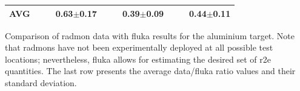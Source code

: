 \documentclass[encoding=utf8,british]{tumphthesis}
\begin{document}
\begin{table}[H]
\begin{subtable}{1\textwidth}
{\begin{tabular}{|l|llr|llr|llr|}
\textbf{AVG}                             &                                                      &                                                       & \textbf{0.63$\pm$0.17}                           &                                                      &                                                       & \textbf{0.39$\pm$0.09}                           &                                                      &                                                       & \textbf{0.44$\pm$0.11}                          \\ \hline
\end{tabular}}
\end{subtable}

\end{table}

\begin{table}[H]
\caption{Comparison of \acrshort{radmon} data with \acrshort{fluka} results for the aluminium target. Note that \acrshort{radmon}s have not been experimentally deployed at all possible test locations; nevertheless, \acrshort{fluka} allows for estimating the desired set of \acrshort{r2e} quantities. The last row presents the average data/\acrshort{fluka} ratio values and their standard deviation.}
\label{tab:benchmark-radmon-aluminium}
\begin{subtable}{1\textwidth}
\label{tab:benchmark-radmon-alOOOO}


\end{subtable}
\end{table}
\end{document}
